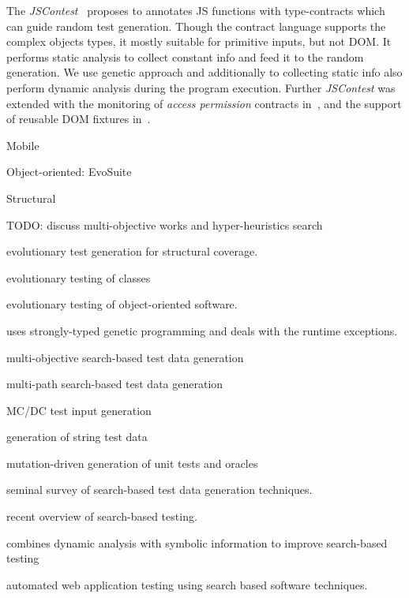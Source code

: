 \documentclass[sigconf,review,anonymous]{acmart}
\begin{document}
The \emph{JSContest}~\cite{heidegger2010contract} proposes to annotates JS functions with type-contracts which can guide random test generation. Though the contract language supports the complex objects types, it mostly suitable for primitive inputs, but not DOM. It performs static analysis to collect constant info and feed it to the random generation. We use genetic approach and additionally to collecting static info also perform dynamic analysis during the program execution. Further \emph{JSContest} was extended with the monitoring of \emph{access permission} contracts in~\cite{heidegger2012jscontest}, and the support of reusable DOM fixtures in~\cite{heidegger2010dom}. 

Mobile

Object-oriented: EvoSuite~\cite{fraser2011evosuite}

Structural

TODO: discuss multi-objective works and hyper-heuristics search

\label{sub.sec.search.based}

\cite{wegener2001evolutionary} evolutionary test generation for structural coverage.

\cite{tonella2004evolutionary} evolutionary testing of classes

\cite{wappler2005using} evolutionary testing of object-oriented software.

\cite{wappler2006evolutionary} uses strongly-typed genetic programming and deals with the runtime exceptions.

\cite{lakhotia2007multi} multi-objective search-based test data generation 

\cite{cao2009search} multi-path search-based test data generation

\cite{awedikian2009mc} MC/DC test input generation 

\cite{shahbazi2016black} generation of string test data

\cite{fraser2012mutation} mutation-driven generation of unit tests and oracles

\cite{mcminn2004search} seminal survey of search-based test data generation techniques.

\cite{mcminn2011search} recent overview of search-based testing.

\cite{baars2011symbolic} combines dynamic analysis with symbolic information to improve search-based testing

\cite{alshahwan2011automated} automated web application testing using search based software techniques.
\end{document}
